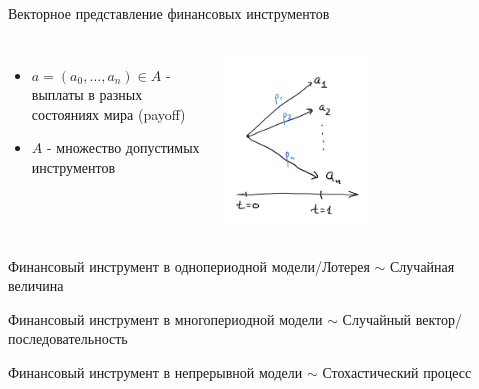 \documentclass{beamer}
\begin{document}
\begin{frame}{Векторное представление финансовых инструментов}

\begin{columns}
    \begin{itemize}
        \item $a=(a_0,\ldots, a_n)\in A$ - выплаты в разных состояниях мира (payoff)
        \item $A$ - множество допустимых инструментов
    \end{itemize}


\includegraphics[width=0.5\textwidth]{2_figs/oneperiod.jpeg}
\end{columns}

Финансовый инструмент в однопериодной модели/Лотерея $\sim$ Случайная величина

Финансовый инструмент в многопериодной модели $\sim$ Случайный вектор/последовательность

Финансовый инструмент в непрерывной модели $\sim$ Стохастический процесс

\end{frame}
\end{document}
